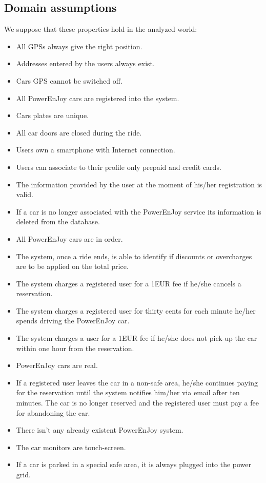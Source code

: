\subsection{Domain assumptions}
\label{Domain_properties}
We suppose that these properties hold in the analyzed world:
\begin{itemize}
	\item All GPSs always give the right position.
	\item Addresses entered by the users always exist.
	\item Cars GPS cannot be switched off.
	\item All PowerEnJoy cars are registered into the system.
	\item Cars plates are unique.
	\item All car doors are closed during the ride.
	\item Users own a smartphone with Internet connection.
	\item Users can associate to their profile only prepaid and credit cards.
	\item The information provided by the user at the moment of his/her registration is valid.
	\item If a car is no longer associated with the PowerEnJoy service its information is deleted from the database.
	\item All PowerEnJoy cars are in order.
	\item The system, once a ride ends, is able to identify if discounts or overcharges are to be applied on the total price.
	\item The system charges a registered user for a 1EUR fee if he/she cancels a reservation.
	\item The system charges a registered user for thirty cents for each minute he/her spends driving the PowerEnJoy car. 
	\item The system charges a user for a 1EUR fee if he/she does not pick-up the car within one hour from the reservation. 
	\item PowerEnJoy cars are real.
	\item If a registered user leaves the car in a non-safe area, he/she continues paying for the reservation until the system notifies him/her via email after ten minutes. The car is no longer reserved and the registered user must pay a fee for abandoning the car.
	\item There isn't any already existent PowerEnJoy system.
	\item The car monitors are touch-screen.
	\item If a car is parked in a special safe area, it is always plugged into the power grid.
\end{itemize}
\newpage
